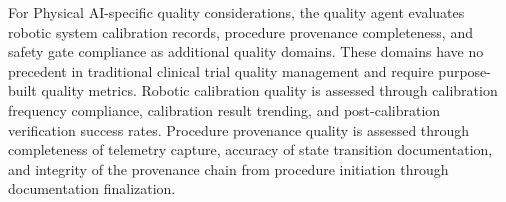 For Physical AI-specific quality considerations, the quality agent evaluates robotic system
calibration records, procedure provenance completeness, and safety gate compliance as
additional quality domains. These domains have no precedent in traditional clinical trial
quality management and require purpose-built quality metrics. Robotic calibration quality
is assessed through calibration frequency compliance, calibration result trending, and
post-calibration verification success rates. Procedure provenance quality is assessed
through completeness of telemetry capture, accuracy of state transition documentation, and
integrity of the provenance chain from procedure initiation through documentation
finalization.
